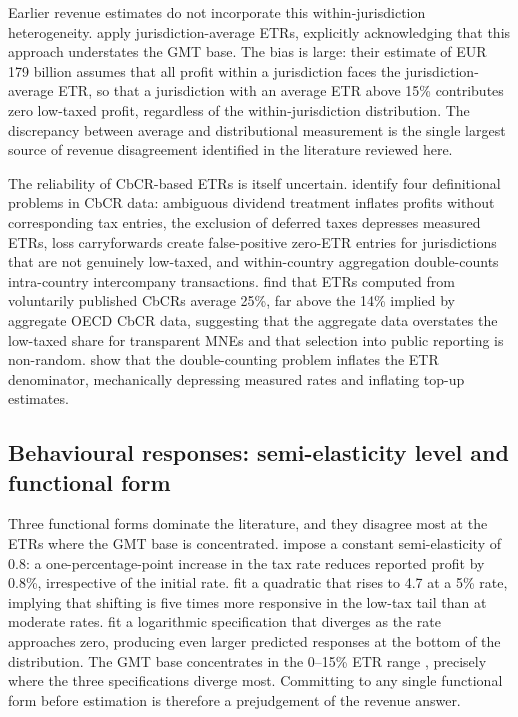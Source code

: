 \documentclass[11pt,a4paper]{article}
\begin{document}
Earlier revenue estimates do not incorporate this within-jurisdiction heterogeneity. \citet{barake2022} apply jurisdiction-average ETRs, explicitly acknowledging that this approach understates the GMT base. The bias is large: their estimate of EUR 179 billion assumes that all profit within a jurisdiction faces the jurisdiction-average ETR, so that a jurisdiction with an average ETR above 15\% contributes zero low-taxed profit, regardless of the within-jurisdiction distribution. The discrepancy between average and distributional measurement is the single largest source of revenue disagreement identified in the literature reviewed here.

The reliability of CbCR-based ETRs is itself uncertain. \citet{bobeldijk2019} identify four definitional problems in CbCR data: ambiguous dividend treatment inflates profits without corresponding tax entries, the exclusion of deferred taxes depresses measured ETRs, loss carryforwards create false-positive zero-ETR entries for jurisdictions that are not genuinely low-taxed, and within-country aggregation double-counts intra-country intercompany transactions. \citet{godar2024} find that ETRs computed from voluntarily published CbCRs average 25\%, far above the 14\% implied by aggregate OECD CbCR data, suggesting that the aggregate data overstates the low-taxed share for transparent MNEs and that selection into public reporting is non-random. \citet{blouin2023} show that the double-counting problem inflates the ETR denominator, mechanically depressing measured rates and inflating top-up estimates. 

\subsection{Behavioural responses: semi-elasticity level and functional form}\label{sec:behaviour}

Three functional forms dominate the literature, and they disagree most at the ETRs where the GMT base is concentrated. \citet{heckemeyer2017} impose a constant semi-elasticity of 0.8: a one-percentage-point increase in the tax rate reduces reported profit by 0.8\%, irrespective of the initial rate. \citet{dowd2017} fit a quadratic that rises to 4.7 at a 5\% rate, implying that shifting is five times more responsive in the low-tax tail than at moderate rates. \citet{garcia-bernardo2024} fit a logarithmic specification that diverges as the rate approaches zero, producing even larger predicted responses at the bottom of the distribution. The GMT base concentrates in the 0--15\% ETR range \citep[\textit{cf.}][]{hugger2026}, precisely where the three specifications diverge most. Committing to any single functional form before estimation is therefore a prejudgement of the revenue answer.
\end{document}
